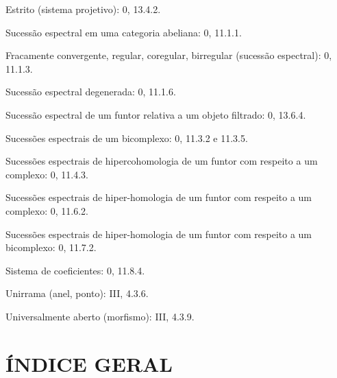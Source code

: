 \begin{flushleft}
Estrito (sistema projetivo): 0, 13.4.2.

Sucessão espectral em uma categoria abeliana: 0, 11.1.1.

Fracamente convergente, regular, coregular, birregular (sucessão espectral):
0, 11.1.3.

Sucessão espectral degenerada: 0, 11.1.6.

Sucessão espectral de um funtor relativa a um objeto filtrado: 0, 13.6.4.

Sucessões espectrais de um bicomplexo: 0, 11.3.2 e 11.3.5.

Sucessões espectrais de hipercohomologia de um funtor com respeito a um complexo:
0, 11.4.3.

Sucessões espectrais de hiper-homologia de um funtor com respeito a um complexo:
0, 11.6.2.

Sucessões espectrais de hiper-homologia de um funtor com respeito a um bicomplexo:
0, 11.7.2.

Sistema de coeficientes: 0, 11.8.4.

Unirrama (anel, ponto): III, 4.3.6.

Universalmente aberto (morfismo): III, 4.3.9.
\end{flushleft}

\clearpage
{}
\section*{ÍNDICE GERAL}

